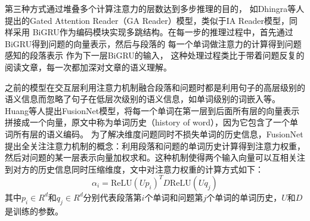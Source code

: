 第三种方式通过堆叠多个计算注意力的层数达到多步推理的目的，
如Dhingra等人提出的Gated Attention Reader（GA Reader）模型，类似于IA Reader模型，同样采用
BiGRU作为编码模块实现多跳结构。在每一步的推理过程中，首先通过BiGRU得到问题的向量表示，然后与段落的
每一个单词做注意力的计算得到问题感知的段落表示
作为下一层BiGRU的输入，
这种处理过程类比于带着问题反复的阅读文章，每一次都加深对文章的语义理解。

\noindent 之前的模型在交互层利用注意力机制融合段落和问题时都是利用句子的高层级别的语义信息而忽略了句子在低层次级别的语义信息，如单词级别的词嵌入等。
Huang等人提出FusionNet模型，将每一个单词在第一层到后面所有层的向量表示拼接成一个向量，原文中称为单词历史（history of word），因为它包含了一个单词所有层的语义编码。
为了解决维度问题同时不损失单词的历史信息，FusionNet提出全关注注意力机制的概念：利用段落和问题的单词历史计算得到注意力权重，然后对问题的某一层表示向量加权求和。这种机制使得两个输入向量可以互相关注到对方的历史信息同时压缩维度，文中对注意力权重的计算方式如下：
\begin{equation}
\alpha_i=\text{ReLU}(Up_i)^TD\text{ReLU}(Uq_j)
\end{equation}
其中$p_i\in R^d$和$q_j\in R^d$分别代表段落第$i$个单词和问题第$j$个单词的单词历史，$U$和$D$是训练的参数。
%

